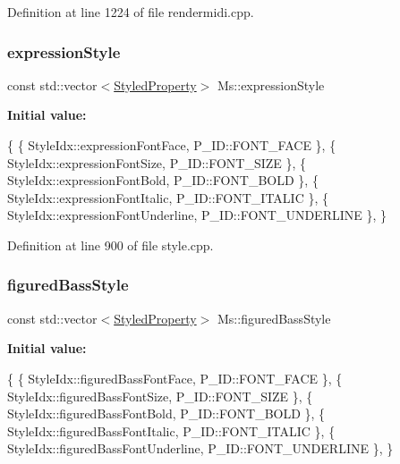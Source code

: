 Definition at line 1224 of file rendermidi.\+cpp.

\mbox{\label{namespace_ms_a955bf9d51ad69f618aeb76d743175052}} 
\subsubsection{\texorpdfstring{expression\+Style}{expressionStyle}}
{\footnotesize\ttfamily const std\+::vector$<$\hyperlink{struct_ms_1_1_styled_property}{Styled\+Property}$>$ Ms\+::expression\+Style}

{\bfseries Initial value\+:}
\begin{DoxyCode}
\{
      \{ StyleIdx::expressionFontFace,                 P\_ID::FONT\_FACE              \},
      \{ StyleIdx::expressionFontSize,                 P\_ID::FONT\_SIZE              \},
      \{ StyleIdx::expressionFontBold,                 P\_ID::FONT\_BOLD              \},
      \{ StyleIdx::expressionFontItalic,               P\_ID::FONT\_ITALIC            \},
      \{ StyleIdx::expressionFontUnderline,            P\_ID::FONT\_UNDERLINE         \},
      \}
\end{DoxyCode}


Definition at line 900 of file style.\+cpp.

\mbox{\label{namespace_ms_ab218064c3ed9b9cbf31bbfe210e8f2f8}} 
\subsubsection{\texorpdfstring{figured\+Bass\+Style}{figuredBassStyle}}
{\footnotesize\ttfamily const std\+::vector$<$\hyperlink{struct_ms_1_1_styled_property}{Styled\+Property}$>$ Ms\+::figured\+Bass\+Style}

{\bfseries Initial value\+:}
\begin{DoxyCode}
\{
      \{ StyleIdx::figuredBassFontFace,                P\_ID::FONT\_FACE              \},
      \{ StyleIdx::figuredBassFontSize,                P\_ID::FONT\_SIZE              \},
      \{ StyleIdx::figuredBassFontBold,                P\_ID::FONT\_BOLD              \},
      \{ StyleIdx::figuredBassFontItalic,              P\_ID::FONT\_ITALIC            \},
      \{ StyleIdx::figuredBassFontUnderline,           P\_ID::FONT\_UNDERLINE         \},
      \}
\end{DoxyCode}


